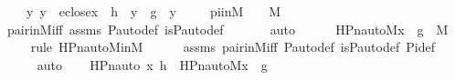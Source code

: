 \begin{isabellebody}
\ \ \ \ {\isachardoublequoteopen}{\isacharparenleft}{\kern0pt}{\isasymAnd}y{\isachardot}{\kern0pt}\ y\ {\isasymin}\ eclose{\isacharparenleft}{\kern0pt}x{\isacharparenright}{\kern0pt}\ {\isasymLongrightarrow}\ h\ {\isacharbackquote}{\kern0pt}\ y\ {\isacharequal}{\kern0pt}\ g\ {\isacharbackquote}{\kern0pt}\ {\isasymlangle}y{\isacharcomma}{\kern0pt}\ {\isasympi}{\isasymrangle}{\isacharparenright}{\kern0pt}{\isachardoublequoteclose}\isanewline
\isanewline
\ \ \isamarkupfalse%
\ piinM\ {\isacharcolon}{\kern0pt}\ {\isachardoublequoteopen}{\isasympi}\ {\isasymin}\ M{\isachardoublequoteclose}\ \isanewline
\ \ \ \ \isamarkupfalse%
\ pair{\isacharunderscore}{\kern0pt}in{\isacharunderscore}{\kern0pt}M{\isacharunderscore}{\kern0pt}iff\ assms{}\ P{\isacharunderscore}{\kern0pt}auto{\isacharunderscore}{\kern0pt}def\ is{\isacharunderscore}{\kern0pt}P{\isacharunderscore}{\kern0pt}auto{\isacharunderscore}{\kern0pt}def\ \isanewline
\ \ \ \ \isamarkupfalse%
\ auto\ \ \isanewline
\isanewline
\ \ \isamarkupfalse%
\ {\isachardoublequoteopen}HPn{\isacharunderscore}{\kern0pt}auto{\isacharunderscore}{\kern0pt}M{\isacharparenleft}{\kern0pt}{\isacharless}{\kern0pt}x{\isacharcomma}{\kern0pt}\ {\isasympi}{\isachargreater}{\kern0pt}{\isacharcomma}{\kern0pt}\ g{\isacharparenright}{\kern0pt}\ {\isasymin}\ M{\isachardoublequoteclose}\ \isanewline
\ \ \ \ \isamarkupfalse%
{\isacharparenleft}{\kern0pt}rule\ HPn{\isacharunderscore}{\kern0pt}auto{\isacharunderscore}{\kern0pt}M{\isacharunderscore}{\kern0pt}in{\isacharunderscore}{\kern0pt}M{\isacharparenright}{\kern0pt}\isanewline
\ \ \ \ \isamarkupfalse%
\ assms{}\ pair{\isacharunderscore}{\kern0pt}in{\isacharunderscore}{\kern0pt}M{\isacharunderscore}{\kern0pt}iff\ P{\isacharunderscore}{\kern0pt}auto{\isacharunderscore}{\kern0pt}def\ is{\isacharunderscore}{\kern0pt}P{\isacharunderscore}{\kern0pt}auto{\isacharunderscore}{\kern0pt}def\ Pi{\isacharunderscore}{\kern0pt}def\isanewline
\ \ \ \ \isamarkupfalse%
\ auto\isanewline
\isanewline
\ \ \isamarkupfalse%
\ {\isachardoublequoteopen}HPn{\isacharunderscore}{\kern0pt}auto{\isacharparenleft}{\kern0pt}{\isasympi}{\isacharcomma}{\kern0pt}\ x{\isacharcomma}{\kern0pt}\ h{\isacharparenright}{\kern0pt}\ {\isacharequal}{\kern0pt}\ HPn{\isacharunderscore}{\kern0pt}auto{\isacharunderscore}{\kern0pt}M{\isacharparenleft}{\kern0pt}{\isacharless}{\kern0pt}x{\isacharcomma}{\kern0pt}\ {\isasympi}{\isachargreater}{\kern0pt}{\isacharcomma}{\kern0pt}\ g{\isacharparenright}{\kern0pt}{\isachardoublequoteclose}\ \isanewline

\end{isabellebody}
